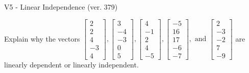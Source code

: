 \begin{exercise}
  \begin{exerciseTitle}V5 - Linear Independence (ver. 379)\end{exerciseTitle}
  \begin{exerciseStatement}
    Explain why the vectors \(\left[\begin{array}{r}
2 \\
2 \\
4 \\
-3 \\
4
\end{array}\right] , \left[\begin{array}{r}
3 \\
-4 \\
-3 \\
0 \\
5
\end{array}\right] , \left[\begin{array}{r}
4 \\
-1 \\
2 \\
4 \\
-5
\end{array}\right] , \left[\begin{array}{r}
-5 \\
16 \\
17 \\
-6 \\
-7
\end{array}\right] , \text{ and } \left[\begin{array}{r}
2 \\
-3 \\
-2 \\
7 \\
-9
\end{array}\right]\) are linearly dependent or linearly independent.	



\end{exerciseStatement}
\end{exercise}

